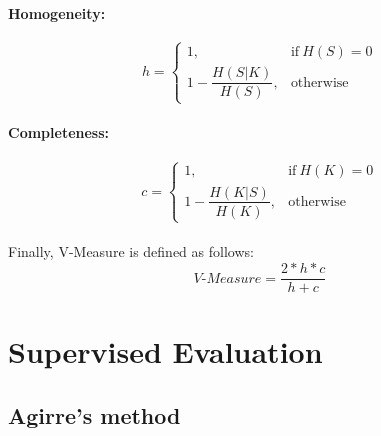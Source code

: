 \paragraph{Homogeneity:}


\begin{equation}
    h =
    \begin{cases}
      1, & \text{if}\ H(S) = 0 \\
      1 - \dfrac{H(S|K)}{H(S)}, & \text{otherwise}
    \end{cases}
  \end{equation}

\paragraph{Completeness:}

\begin{equation}
    c =
    \begin{cases}
      1, & \text{if}\ H(K) = 0 \\
      1 - \dfrac{H(K|S)}{H(K)}, & \text{otherwise}
    \end{cases}
  \end{equation} \\

Finally, V-Measure is defined as follows: \\

\begin{equation}
\textit{V-Measure} = \dfrac{2 * h * c}{h + c}
\end{equation}


\section{Supervised Evaluation}

\subsection{Agirre’s method}

